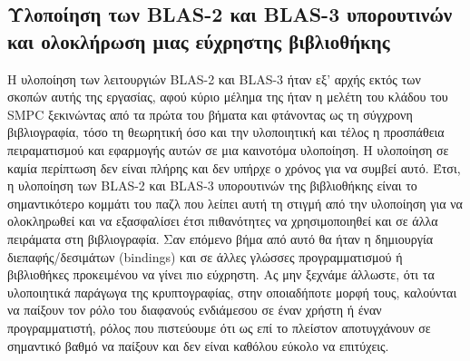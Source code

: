 \subsection{Υλοποίηση των BLAS-2 και BLAS-3 υπορουτινών και ολοκλήρωση μιας εύχρηστης βιβλιοθήκης}
Η υλοποίηση των λειτουργιών BLAS-2 και BLAS-3 ήταν εξ' αρχής εκτός των σκοπών αυτής της εργασίας, αφού κύριο μέλημα της ήταν η μελέτη του κλάδου του SMPC ξεκινώντας από τα πρώτα του βήματα και φτάνοντας ως τη σύγχρονη βιβλιογραφία, τόσο τη θεωρητική όσο και την υλοποιητική και τέλος η προσπάθεια πειραματισμού και εφαρμογής αυτών σε μια καινοτόμα υλοποίηση. Η υλοποίηση σε καμία περίπτωση δεν είναι πλήρης και δεν υπήρχε ο χρόνος για να συμβεί αυτό. Έτσι, η υλοποίηση των BLAS-2 και BLAS-3 υπορουτινών της βιβλιοθήκης είναι το σημαντικότερο κομμάτι του παζλ που λείπει αυτή τη στιγμή από την υλοποίηση για να ολοκληρωθεί και να εξασφαλίσει έτσι πιθανότητες να χρησιμοποιηθεί και σε άλλα πειράματα στη βιβλιογραφία. Σαν επόμενο βήμα από αυτό θα ήταν η δημιουργία διεπαφής/δεσιμάτων (bindings) και σε άλλες γλώσσες προγραμματισμού ή βιβλιοθήκες προκειμένου να γίνει πιο εύχρηστη. Ας μην ξεχνάμε άλλωστε, ότι τα υλοποιητικά παράγωγα της κρυπτογραφίας, στην οποιαδήποτε μορφή τους, καλούνται να παίξουν τον ρόλο του διαφανούς ενδιάμεσου σε έναν χρήστη ή έναν προγραμματιστή, ρόλος που πιστεύουμε ότι ως επί το πλείστον αποτυγχάνουν σε σημαντικό βαθμό να παίξουν και δεν είναι καθόλου εύκολο να επιτύχεις.

